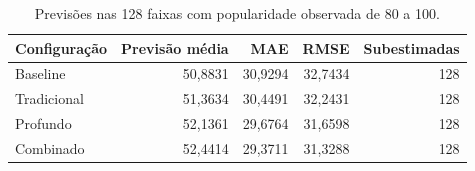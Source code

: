 \begin{table}[htbp]
\centering\small
\caption{Previsões nas 128 faixas com popularidade observada de 80 a 100.}
\label{tab:cauda}
\begin{tabular}{lrrrr}
\toprule
Configuração & Previsão média & MAE & RMSE & Subestimadas \\
\midrule
Baseline & 50,8831 & 30,9294 & 32,7434 & 128 \\
Tradicional & 51,3634 & 30,4491 & 32,2431 & 128 \\
Profundo & 52,1361 & 29,6764 & 31,6598 & 128 \\
Combinado & 52,4414 & 29,3711 & 31,3288 & 128 \\
\bottomrule
\end{tabular}
\end{table}
